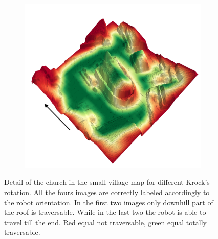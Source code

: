 \documentclass[../document.tex]{subfiles}
\begin{document}
\begin{figure} [htbp]
\begin{subfigure}[b]{0.45\textwidth}
    \end{subfigure}
    \begin{subfigure}[b]{0.45\textwidth}
        \includegraphics[width=\linewidth]{../img/4/traversability/sullens-church/-180.png}  
    \end{subfigure}
    \caption{Detail of the church in the small village map for different Krock's rotation. All the fours images are correctly labeled accordingly to the robot orientation. In the first two images only downhill part of the roof is traversable. While in the last two the robot is able to travel till the end. Red equal not traversable, green equal totally traversable.}
    \label{fig :  small-village-roof-trav}
    \end{figure}
\end{document}
